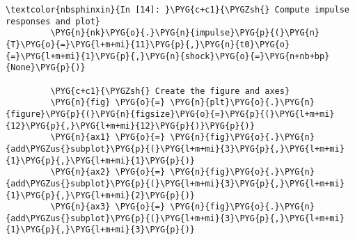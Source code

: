 \documentclass[letterpaper,10pt,openany,oneside,english]{sphinxmanual}
\begin{document}
\begin{Verbatim}[commandchars=\\\{\}]
\textcolor{nbsphinxin}{In [14]: }\PYG{c+c1}{\PYGZsh{} Compute impulse responses and plot}
         \PYG{n}{nk}\PYG{o}{.}\PYG{n}{impulse}\PYG{p}{(}\PYG{n}{T}\PYG{o}{=}\PYG{l+m+mi}{11}\PYG{p}{,}\PYG{n}{t0}\PYG{o}{=}\PYG{l+m+mi}{1}\PYG{p}{,}\PYG{n}{shock}\PYG{o}{=}\PYG{n+nb+bp}{None}\PYG{p}{)}
         
         \PYG{c+c1}{\PYGZsh{} Create the figure and axes}
         \PYG{n}{fig} \PYG{o}{=} \PYG{n}{plt}\PYG{o}{.}\PYG{n}{figure}\PYG{p}{(}\PYG{n}{figsize}\PYG{o}{=}\PYG{p}{(}\PYG{l+m+mi}{12}\PYG{p}{,}\PYG{l+m+mi}{12}\PYG{p}{)}\PYG{p}{)}
         \PYG{n}{ax1} \PYG{o}{=} \PYG{n}{fig}\PYG{o}{.}\PYG{n}{add\PYGZus{}subplot}\PYG{p}{(}\PYG{l+m+mi}{3}\PYG{p}{,}\PYG{l+m+mi}{1}\PYG{p}{,}\PYG{l+m+mi}{1}\PYG{p}{)}
         \PYG{n}{ax2} \PYG{o}{=} \PYG{n}{fig}\PYG{o}{.}\PYG{n}{add\PYGZus{}subplot}\PYG{p}{(}\PYG{l+m+mi}{3}\PYG{p}{,}\PYG{l+m+mi}{1}\PYG{p}{,}\PYG{l+m+mi}{2}\PYG{p}{)}
         \PYG{n}{ax3} \PYG{o}{=} \PYG{n}{fig}\PYG{o}{.}\PYG{n}{add\PYGZus{}subplot}\PYG{p}{(}\PYG{l+m+mi}{3}\PYG{p}{,}\PYG{l+m+mi}{1}\PYG{p}{,}\PYG{l+m+mi}{3}\PYG{p}{)}
         

\end{Verbatim}
\end{document}
